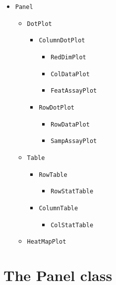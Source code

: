 \documentclass[]{book}
\providecommand{\tightlist}{%
  \setlength{\itemsep}{0pt}\setlength{\parskip}{0pt}}
\begin{document}
\begin{itemize}
\tightlist
\item
  \texttt{Panel}

  \begin{itemize}
  \tightlist
  \item
    \texttt{DotPlot}

    \begin{itemize}
    \tightlist
    \item
      \texttt{ColumnDotPlot}

      \begin{itemize}
      \tightlist
      \item
        \texttt{RedDimPlot}
      \item
        \texttt{ColDataPlot}
      \item
        \texttt{FeatAssayPlot}
      \end{itemize}
    \item
      \texttt{RowDotPlot}

      \begin{itemize}
      \tightlist
      \item
        \texttt{RowDataPlot}
      \item
        \texttt{SampAssayPlot}
      \end{itemize}
    \end{itemize}
  \item
    \texttt{Table}

    \begin{itemize}
    \tightlist
    \item
      \texttt{RowTable}

      \begin{itemize}
      \tightlist
      \item
        \texttt{RowStatTable}
      \end{itemize}
    \item
      \texttt{ColumnTable}

      \begin{itemize}
      \tightlist
      \item
        \texttt{ColStatTable}
      \end{itemize}
    \end{itemize}
  \item
    \texttt{HeatMapPlot}
  \end{itemize}
\end{itemize}

\hypertarget{the-panel-class}{%
\section{The Panel class}\label{the-panel-class}}
\end{document}
